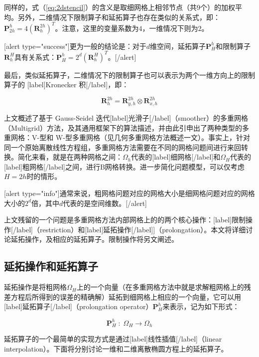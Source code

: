 \documentclass[12pt, UTF8, nofonts]{ctexart}
\begin{document}
同样的，式（\ref{eq:2dstencil}）的含义是取细网格上相邻节点（共$9$个）的加权平均。另外，二维情况下限制算子和延拓算子也存在类似的关系式，即：$\boldsymbol{P}_{2h}^{h}=4\left(\boldsymbol{R}_{h}^{2h}\right)^T$。注意，这里的变量系数为$4$，一维情况下则为$2$。

[alert type="success"]更为一般的结论是：对于$d$维空间，延拓算子$\boldsymbol{P}_{H}^{h}$和限制算子$\boldsymbol{R}_{h}^{H}$具有关系式：$\boldsymbol{P}_{H}^{h}=2^d\left(\boldsymbol{R}_{h}^{H}\right)^T$。[/alert]

最后，类似延拓算子，二维情况下的限制算子也可以表示为两个一维方向上的限制算子的 [label]Kronecker 积[/label]，即：

\[
  \boldsymbol{R}_{h}^{2h} = \boldsymbol{R}_{y,h}^{2h} \otimes \boldsymbol{R}_{x,h}^{2h}
\]

\pagebreak

上文概述了基于 Gauss-Seidel 迭代[label]光滑子[/label]（smoother）的多重网格（Multigrid）方法，及其通用框架下的算法描述，并由此引申出了两种类型的多重网格：V-型和 W-型多重网格（见几何多重网格方法概述一文）。事实上，针对同一个原始离散线性方程组，多重网格方法需要在不同的网格问题间进行来回转换。简化来看，就是在两种网格之间：$\Omega_h$代表的[label]细网格[/label]和$\Omega_{H}$代表的[label]粗网格[/label]之间，进行B网格转换。进一步简化问题模型，可以仅考虑$H=2h$时的情形。

[alert type="info"]通常来说，粗网格问题对应的网格大小是细网格问题对应的网格大小的$2^d$倍，其中$d$代表的是空间维数。[/alert]

上文残留的一个问题是多重网格方法内部网格上的的两个核心操作：[label]限制操作[/label]（restriction）和[label]延拓操作[/label]]（prolongation）。本文将详细讨论延拓操作，及相应的延拓算子。限制操作将另文阐述。

\subsection*{延拓操作和延拓算子}

延拓操作是将粗网格$\Omega_H$上的一个向量（在多重网格方法中就是求解粗网格上的残差方程后所得到的误差的精确解）延拓到细网格上相应的一个向量，它可以用[label]延拓算子[/label]（prolongation operator）$\boldsymbol{P}_H^h$来表示，记为如下形式：

\begin{equation}
  \label{eq:prolong}
  \boldsymbol{P}_H^h\;:\;\Omega_H \to \Omega_h
\end{equation}

延拓算子的一个最简单的实现方式是通过[label]线性插值[/label]（linear interpolation）。下面将分别讨论一维和二维离散椭圆方程上的延拓算子。
\end{document}
